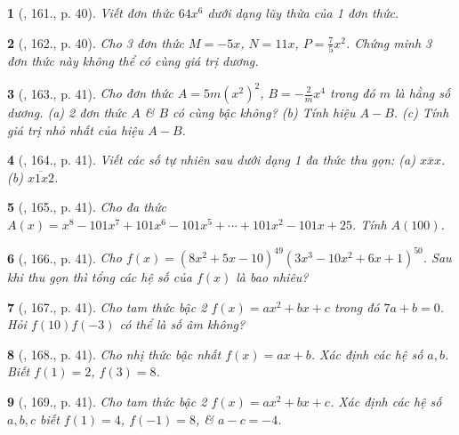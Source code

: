 \documentclass{article}
\newtheorem{baitoan}{}
\begin{document}
\begin{baitoan}[\cite{Tuyen_Toan_7}, 161., p. 40]
	Viết đơn thức $64x^6$ dưới dạng lũy thừa của 1 đơn thức.
\end{baitoan}

\begin{baitoan}[\cite{Tuyen_Toan_7}, 162., p. 40]
	Cho 3 đơn thức $M = -5x$, $N = 11x$, $P = \frac{7}{5}x^2$. Chứng minh 3 đơn thức này không thể có cùng giá trị dương.
\end{baitoan}

\begin{baitoan}[\cite{Tuyen_Toan_7}, 163., p. 41]
	Cho đơn thức $A = 5m(x^2)^2$, $B = -\frac{2}{m}x^4$ trong đó $m$ là hằng số dương. (a) 2 đơn thức $A$ \& $B$ có cùng bậc không? (b) Tính hiệu $A - B$. (c) Tính giá trị nhỏ nhất của hiệu $A - B$.
\end{baitoan}

\begin{baitoan}[\cite{Tuyen_Toan_7}, 164., p. 41]
	Viết các số tự nhiên sau dưới dạng 1 đa thức thu gọn: (a) $\overline{xxx}$. (b) $\overline{x1x2}$.
\end{baitoan}

\begin{baitoan}[\cite{Tuyen_Toan_7}, 165., p. 41]
	Cho đa thức $A(x) = x^8 - 101x^7 + 101x^6 - 101x^5 + \cdots + 101x^2 - 101x + 25$. Tính $A(100)$.
\end{baitoan}

\begin{baitoan}[\cite{Tuyen_Toan_7}, 166., p. 41]
	Cho $f(x) = (8x^2 + 5x - 10)^{49}(3x^3 - 10x^2 + 6x + 1)^{50}$. Sau khi thu gọn thì tổng các hệ số của $f(x)$ là bao nhiêu?
\end{baitoan}

\begin{baitoan}[\cite{Tuyen_Toan_7}, 167., p. 41]
	Cho tam thức bậc 2 $f(x) = ax^2 + bx + c$ trong đó $7a + b = 0$. Hỏi $f(10)f(-3)$ có thể là số âm không?
\end{baitoan}

\begin{baitoan}[\cite{Tuyen_Toan_7}, 168., p. 41]
	Cho nhị thức bậc nhất $f(x) = ax + b$. Xác định các hệ số $a,b$. Biết $f(1) = 2$, $f(3) = 8$.
\end{baitoan}

\begin{baitoan}[\cite{Tuyen_Toan_7}, 169., p. 41]
	Cho tam thức bậc 2 $f(x) = ax^2 + bx + c$. Xác định các hệ số $a,b,c$ biết $f(1) = 4$, $f(-1) = 8$, \& $a - c = -4$.
\end{baitoan}
\end{document}
